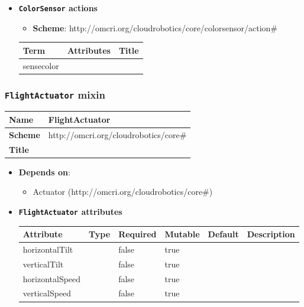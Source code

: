 \begin{itemize}
\item \textbf{\texttt{ColorSensor} actions}

\begin{itemize}
	\item \textbf{Scheme}: http://omcri.org/cloudrobotics/core/colorsensor/action\#
\end{itemize}

\begin{center}
\begin{tabular}{|l|l|l|}
  \hline
  \textbf{Term}  & \textbf{Attributes} & \textbf{Title} \\
  \hline  
  sensecolor & &  \\
  \hline
\end{tabular}
\end{center}
\end{itemize}

 
\subsubsection{\texttt{FlightActuator} mixin}
\begin{center}
\begin{tabular}{|l|l|}
  \hline
  \textbf{Name} & FlightActuator \\
  \hline  
  \textbf{Scheme} & http://omcri.org/cloudrobotics/core\# \\
  \hline
  \textbf{Title} &  \\
  \hline
\end{tabular}
\end{center}

\begin{itemize}
\item \textbf{Depends on}:
\begin{itemize}
	\item Actuator (http://omcri.org/cloudrobotics/core\#)
\end{itemize}
\end{itemize}

\begin{itemize}
\item \textbf{\texttt{FlightActuator} attributes}

\begin{tabularx}{\textwidth}{|l|l|p{1.4cm}|p{1.3cm}|l|X|}
  \hline
  \textbf{Attribute} & \textbf{Type} & \textbf{Required} & \textbf{Mutable} & \textbf{Default} & \textbf{Description} \\
  \hline  
  horizontalTilt &  & false & true &  &  \\
  \hline
  verticalTilt &  & false & true &  &  \\
  \hline
  horizontalSpeed &  & false & true &  &  \\
  \hline
  verticalSpeed &  & false & true &  &  \\
  \hline
\end{tabularx}
\end{itemize}

